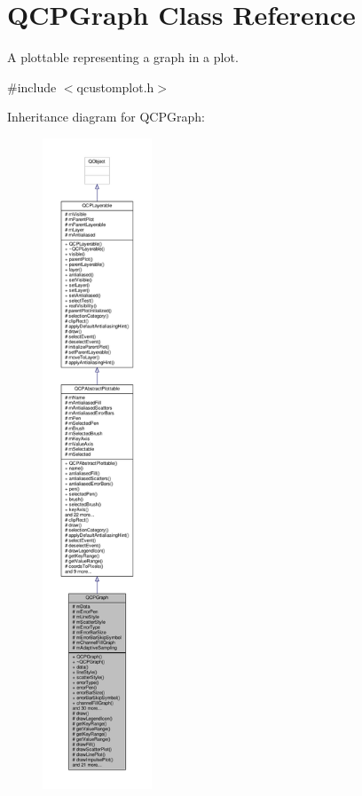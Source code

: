 \hypertarget{class_q_c_p_graph}{}\section{Q\+C\+P\+Graph Class Reference}
\label{class_q_c_p_graph}


A plottable representing a graph in a plot.  




{\ttfamily \#include $<$qcustomplot.\+h$>$}



Inheritance diagram for Q\+C\+P\+Graph\+:\nopagebreak
\begin{figure}[H]
\begin{center}
\leavevmode
\includegraphics[height=550pt]{class_q_c_p_graph__inherit__graph}
\end{center}
\end{figure}


